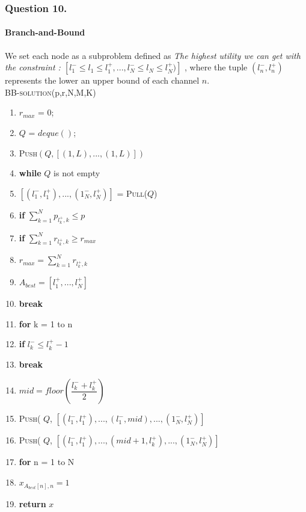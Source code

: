\documentclass[11pt, oneside]{report}
\begin{document}
\subsubsection{Question 10. }
\paragraph{Branch-and-Bound} We set each node as a subproblem defined as \textit{The highest utility we can get with the constraint : $[ l_{1}^{-} \leq l_1 \leq l_{1}^{+},...,l_{N}^{-}\leq l_N \leq l_{N}^{+})]$ }, where the tuple $( l_n^{-}, l_n^{+} )$ represents the lower an upper bound of each channel $n$. \\

\noindent\textsc{BB-solution}(p,r,N,M,K)
\begin{enumerate}[1\ ]
\setlength{\topsep}{0.05ex}
\setlength{\itemsep}{0.05ex}
\item $r_{max}$ = 0;
\item $Q$ = $deque()$;
\item \textsc{Push}$(Q, [(1,L),...,(1,L)])$
\item \textbf{while} $Q$ is not empty
\item \qquad $[(l_1^{-},l_1^{+}),...,(1_N^{-},l_N^{+})]$ = \textsc{Pull}($Q$)
\item \qquad \textbf{if} $\sum_{k=1}^{N} p_{l_{k}^{+}, k} \leq p$
\item \qquad \qquad \textbf{if} $\sum_{k=1}^{N} r_{l_{k}^{+}, k} \geq r_{max}$
\item \qquad \qquad \qquad $r_{max} = \sum_{k=1}^{N} r_{l_{k}^{+}, k}$
\item \qquad \qquad \qquad $A_{best} = [l_1^{+},..., l_N^{+}]$
\item \qquad \qquad \qquad \textbf{break}
\item \qquad \textbf{for} k = 1 to n
\item \qquad \qquad \textbf{if} $l_k^{-} \leq l_k^{+} - 1$
\item \qquad \qquad \qquad \textbf{break}
\item \qquad $mid = floor(\dfrac{l_k^{-} + l_k^{+}}{2})$
\item \qquad \textsc{Push}( $Q$, $[(l_1^{-},l_1^{+}),...,(l_1^{-},mid),...,(1_N^{-},l_N^{+})]$
\item \qquad \textsc{Push}( $Q$, $[(l_1^{-},l_1^{+}),...,(mid+1,l_k^{+}),...,(1_N^{-},l_N^{+})]$
\item \textbf{for} n = 1 to N
\item \qquad $x_{A_{best}[n],n} = 1$
\item \textbf{return} $x$
\end{enumerate}
\end{document}
